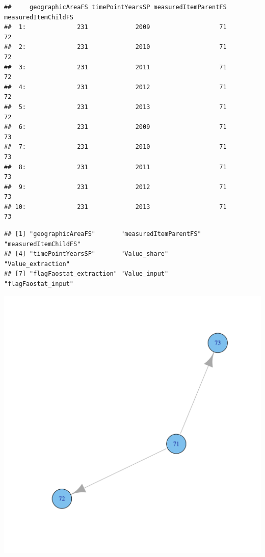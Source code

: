 \documentclass[nojss]{jss}
\begin{document}
\begin{knitrout}
\begin{kframe}
\begin{verbatim}
##     geographicAreaFS timePointYearsSP measuredItemParentFS measuredItemChildFS
##  1:              231             2009                   71                  72
##  2:              231             2010                   71                  72
##  3:              231             2011                   71                  72
##  4:              231             2012                   71                  72
##  5:              231             2013                   71                  72
##  6:              231             2009                   71                  73
##  7:              231             2010                   71                  73
##  8:              231             2011                   71                  73
##  9:              231             2012                   71                  73
## 10:              231             2013                   71                  73
\end{verbatim}
\begin{alltt}
\hlopt{$}
\end{alltt}
\begin{verbatim}
## [1] "geographicAreaFS"       "measuredItemParentFS"   "measuredItemChildFS"   
## [4] "timePointYearsSP"       "Value_share"            "Value_extraction"      
## [7] "flagFaostat_extraction" "Value_input"            "flagFaostat_input"
\end{verbatim}
\end{kframe}

{\centering \includegraphics[width=\maxwidth]{figure/unnamed-chunk-6-1} 

}



\end{knitrout}
\end{document}
